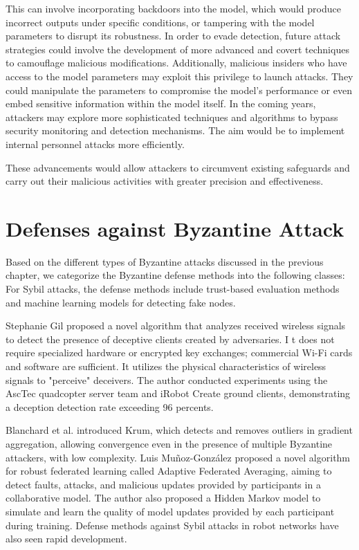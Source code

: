 \documentclass[conference]{IEEEtran}
\begin{document}
This can involve incorporating backdoors into the model, which would produce incorrect outputs under specific conditions,
or tampering with the model parameters to disrupt its robustness.
In order to evade detection, future attack strategies could involve the development of more advanced and covert
techniques to camouflage malicious modifications. Additionally, malicious insiders who have access to the
model parameters may exploit this privilege to launch attacks. They could manipulate the parameters to
compromise the model's performance or even embed sensitive information within the model itself.
In the coming years, attackers may explore more sophisticated techniques and algorithms to bypass security monitoring and detection mechanisms.
The aim would be to implement internal personnel attacks more efficiently.

These advancements would allow attackers to circumvent existing safeguards and carry out their malicious activities with greater precision and effectiveness.



\section{Defenses against Byzantine Attack}

Based on the different types of Byzantine attacks discussed in the previous chapter, we categorize the Byzantine defense methods into the following classes:
For Sybil attacks, the defense methods include trust-based evaluation methods and machine learning models for detecting fake nodes.


Stephanie Gil \cite{b125} proposed a novel algorithm that analyzes received wireless signals to detect the presence of deceptive clients created by adversaries. I
t does not require specialized hardware or encrypted key exchanges; commercial Wi-Fi cards and software are sufficient.
It utilizes the physical characteristics of wireless signals to "perceive" deceivers.
The author conducted experiments using the AscTec quadcopter server team and iRobot Create ground clients,
demonstrating a deception detection rate exceeding 96 percents.


Blanchard et al. \cite{b126} introduced Krum, which detects and removes outliers in gradient aggregation, allowing convergence
even in the presence of multiple Byzantine attackers, with low complexity.
Luis Muñoz-González \cite{b127} proposed a novel algorithm for robust federated learning called Adaptive Federated Averaging,
aiming to detect faults, attacks, and malicious updates provided by participants in a collaborative model.
The author also proposed a Hidden Markov model to simulate and learn the quality of model updates provided by each participant during training.
Defense methods against Sybil attacks in robot networks have also seen rapid development.
\end{document}
